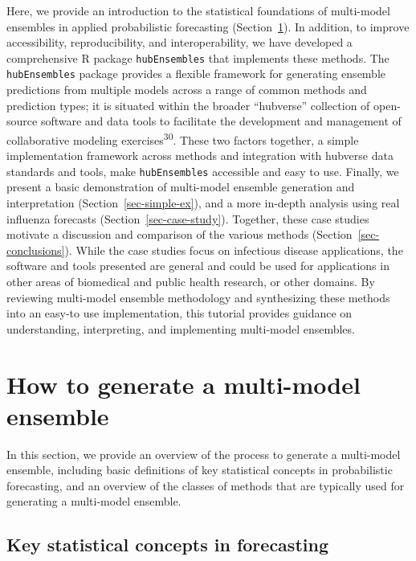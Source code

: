 \documentclass[
  letterpaper,
  DIV=11,
  numbers=noendperiod]{scrartcl}
\begin{document}
Here, we provide an introduction to the statistical foundations of
multi-model ensembles in applied probabilistic forecasting
(Section~\ref{sec-defs}). In addition, to improve accessibility,
reproducibility, and interoperability, we have developed a comprehensive
R package \texttt{hubEnsembles} that implements these methods. The
\texttt{hubEnsembles} package provides a flexible framework for
generating ensemble predictions from multiple models across a range of
common methods and prediction types; it is situated within the broader
``hubverse'' collection of open-source software and data tools to
facilitate the development and management of collaborative modeling
exercises\textsuperscript{30}. These two factors together, a simple
implementation framework across methods and integration with hubverse
data standards and tools, make \texttt{hubEnsembles} accessible and easy
to use. Finally, we present a basic demonstration of multi-model
ensemble generation and interpretation (Section~\ref{sec-simple-ex}),
and a more in-depth analysis using real influenza forecasts
(Section~\ref{sec-case-study}). Together, these case studies motivate a
discussion and comparison of the various methods
(Section~\ref{sec-conclusions}). While the case studies focus on
infectious disease applications, the software and tools presented are
general and could be used for applications in other areas of biomedical
and public health research, or other domains. By reviewing multi-model
ensemble methodology and synthesizing these methods into an easy-to use
implementation, this tutorial provides guidance on understanding,
interpreting, and implementing multi-model ensembles.

\section{How to generate a multi-model ensemble}\label{sec-defs}

In this section, we provide an overview of the process to generate a
multi-model ensemble, including basic definitions of key statistical
concepts in probabilistic forecasting, and an overview of the classes of
methods that are typically used for generating a multi-model ensemble.

\subsection{Key statistical concepts in
forecasting}\label{key-statistical-concepts-in-forecasting}
\end{document}

